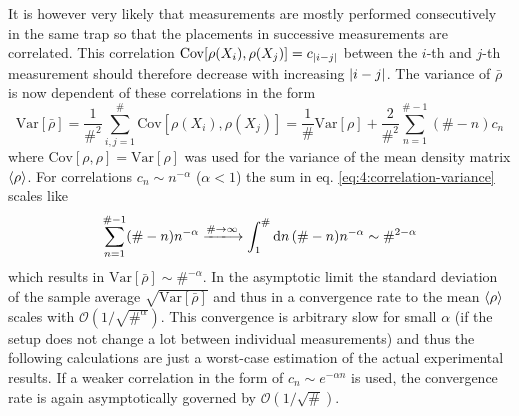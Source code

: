 It is however very likely that measurements are mostly performed consecutively in the same trap so that the placements in successive measurements are correlated.
This correlation $\mathrm{Cov}[\rho(X_i), \rho(X_j)] = c_{\left\lvert i-j\right\rvert}$ between the $i$-th and $j$-th measurement should therefore decrease with increasing $\left\lvert i-j\right\rvert$.
The variance of $\bar{\rho}$ is now dependent of these correlations in the form \cite[p. 1227]{Riley_2018}
\begin{equation}\label{eq:4:correlation-variance}
  \mathrm{Var}[\bar{\rho}] = \frac{1}{\#^2} \sum_{i,j=1}^{\#} \mathrm{Cov}[\rho(X_i), \rho(X_j)] = \frac{1}{\#}\mathrm{Var}[\rho] + \frac{2}{\#^2}\sum_{n=1}^{\# - 1}(\# - n) c_n
\end{equation}
where $\mathrm{Cov}[\rho, \rho] = \mathrm{Var}[\rho]$ was used for the variance of the mean density matrix $\left\langle\rho\right\rangle$.
For correlations $c_n \sim n^{-\alpha}$ ($\alpha < 1$) the sum in eq. \eqref{eq:4:correlation-variance} scales like
\begin{equation}
  \sum_{n=1}^{\# - 1}(\# - n)n^{-\alpha} \xlongrightarrow{\#\rightarrow\infty} \int_1^{\#}\dd n \, (\#-n)n^{-\alpha} \sim \#^{2-\alpha}
\end{equation}
which results in $\mathrm{Var}[\bar{\rho}] \sim \#^{-\alpha}$. In the asymptotic limit the standard deviation of the sample average $\sqrt{\mathrm{Var}[\bar{\rho}]}$ and thus in a convergence rate to the mean $\left\langle\rho\right\rangle$ scales with $\mathcal{O}(1/\sqrt{\#^\alpha})$.
This convergence is arbitrary slow for small $\alpha$ (if the setup does not change a lot between individual measurements) and thus the following calculations are just a worst-case estimation of the actual experimental results.
If a weaker correlation in the form of $c_n \sim e^{-\alpha n}$ is used, the convergence rate is again asymptotically governed by $\mathcal{O}(1/\sqrt{\#})$.









